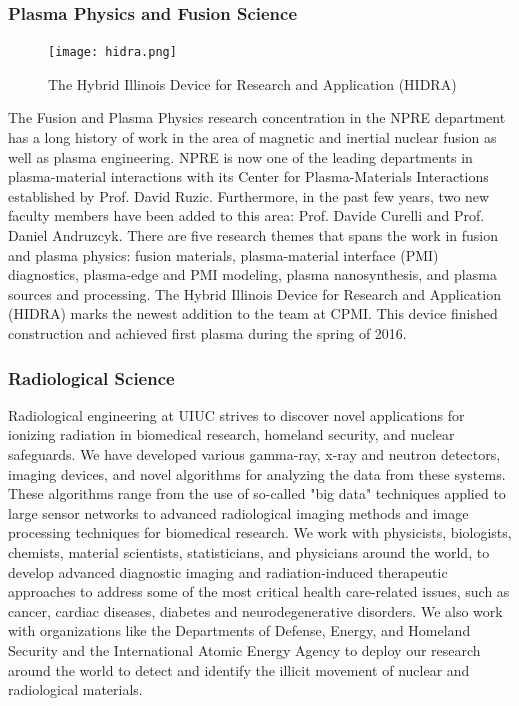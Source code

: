 \subsubsection{Plasma Physics and Fusion Science}
\begin{figure}
  \begin{center}
  \vspace{-\baselineskip}
    \texttt{[image: hidra.png]}
    \caption{The Hybrid Illinois Device for Research and Application (HIDRA)}
  \end{center}
\end{figure}
The Fusion and Plasma Physics research concentration in the NPRE department has a long history of work in the area of magnetic and inertial nuclear fusion as well as plasma engineering. NPRE is now one of the leading departments in plasma-material interactions with its Center for Plasma-Materials Interactions established by Prof. David Ruzic. Furthermore, in the past few years, two new faculty members have been added to this area: Prof. Davide Curelli and Prof. Daniel Andruzcyk. There are five research themes that spans the work in fusion and plasma physics: fusion materials, plasma-material interface (PMI) diagnostics, plasma-edge and PMI modeling, plasma nanosynthesis, and plasma sources and processing. The Hybrid Illinois Device for Research and Application (HIDRA) marks the newest addition to the team at CPMI. This device finished construction and achieved first plasma during the spring of 2016. \\


\subsubsection{Radiological Science}
Radiological engineering at UIUC strives to discover novel applications for ionizing radiation in biomedical research, homeland security, and nuclear safeguards. We have developed various gamma-ray, x-ray and neutron detectors, imaging devices, and novel algorithms for analyzing the data from these systems. These algorithms range from the use of so-called "big data" techniques applied to large sensor networks to advanced radiological imaging methods and image processing techniques for biomedical research. We work with physicists, biologists, chemists, material scientists, statisticians, and physicians around the world, to develop advanced diagnostic imaging and radiation-induced therapeutic approaches to address some of the most critical health care-related issues, such as cancer, cardiac diseases, diabetes and neurodegenerative disorders. We also work with organizations like the Departments of Defense, Energy, and Homeland Security and the International Atomic Energy Agency to deploy our research around the world to detect and identify the illicit movement of nuclear and radiological materials.

